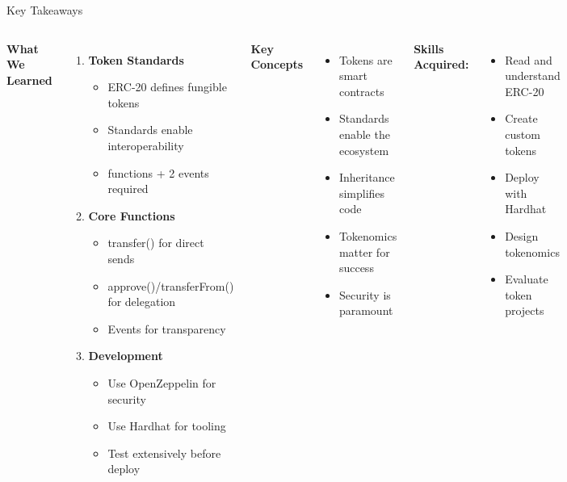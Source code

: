 \documentclass[8pt,aspectratio=169]{beamer}
\begin{document}
\begin{frame}[t]{Key Takeaways}
\begin{columns}[T]
\textbf{What We Learned}

\begin{enumerate}
\item \textbf{Token Standards}
\begin{itemize}
\item \checkmark ERC-20 defines fungible tokens
\item \checkmark Standards enable interoperability
\item {} functions + 2 events required
\end{itemize}

\item \textbf{Core Functions}
\begin{itemize}
\item \checkmark transfer() for direct sends
\item \checkmark approve()/transferFrom() for delegation
\item \checkmark Events for transparency
\end{itemize}

\item \textbf{Development}
\begin{itemize}
\item \checkmark Use OpenZeppelin for security
\item \checkmark Use Hardhat for tooling
\item \checkmark Test extensively before deploy
\end{itemize}
\end{enumerate}

\textbf{Key Concepts}

\begin{itemize}
\item[\textcolor{mlgreen}{$\checkmark$}] Tokens are smart contracts
\item[\textcolor{mlgreen}{$\checkmark$}] Standards enable the ecosystem
\item[\textcolor{mlgreen}{$\checkmark$}] Inheritance simplifies code
\item[\textcolor{mlgreen}{$\checkmark$}] Tokenomics matter for success
\item[\textcolor{mlgreen}{$\checkmark$}] Security is paramount
\end{itemize}

\vspace{0.5em}
\textbf{Skills Acquired:}
\begin{itemize}
\item \checkmark Read and understand ERC-20
\item \checkmark Create custom tokens
\item \checkmark Deploy with Hardhat
\item \checkmark Design tokenomics
\item \checkmark Evaluate token projects
\end{itemize}
\end{columns}


\end{frame}
\end{document}
